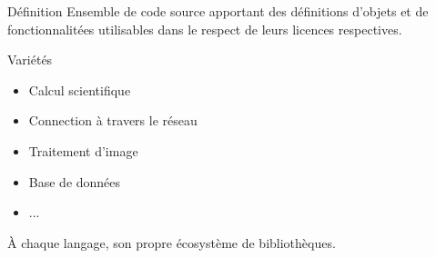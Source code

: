 \begin{frame}{Définition}
    Ensemble de code source apportant des définitions d'objets et de fonctionnalitées utilisables dans le respect de leurs licences respectives.
\end{frame}

\begin{frame}{Variétés}
    \begin{itemize}
        \item Calcul scientifique
        \item Connection à travers le réseau
        \item Traitement d'image
        \item Base de données
        \item ...
    \end{itemize}
    À chaque langage, son propre écosystème de bibliothèques.
\end{frame}

